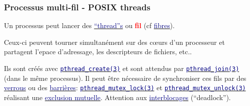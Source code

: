 \documentclass[lualatex,11pt,a4paper,svgnames,french]{beamer}
\newcommand{\clbhref}[2]{{\href{https:#1}{{\textcolor{Navy}{#2}}}}}
\newcommand{\clbman}[2]{{\href{https://man7.org/linux/man-pages/#1.html}{{\textcolor{Navy}{\texttt{#2}}}}}}
\newcommand{\clbrougras}[1]{{\textcolor{Red}{\textbf{#1}}}}
\begin{document}
\begin{frame}\frametitle{Processus multi-fil - POSIX threads}
  Un processus peut lancer des
  \clbhref{//fr.wikipedia.org/wiki/Thread\_(informatique)}{``thread''s}
  ou \clbrougras{fil} (cf
  \clbhref{//fr.wikipedia.org/wiki/Fibre\_(informatique)}{fibres}).

  \smallskip
  
Ceux-ci peuvent tourner simultanément sur des c{\oe}urs d'un
processeur et partagent l'epace d'adressage, les descripteurs de
fichiers, etc..

\smallskip
%
Ils sont créés avec
\clbman{man3/pthread_create.3}{pthread\_create(3)} et sont attendus par
\clbman{man3/pthread_join.3}{pthread\_join(3)} (dans le même processus).
%   
\smallskip
Il peut être nécessaire de synchroniser ces fils par des
\clbhref{https://fr.wikipedia.org/wiki/Verrou\_(informatique)}{verrous}
ou des
\clbhref{https://fr.wikipedia.org/wiki/Barrière\_de\_syncrhonisation}{barrières}:
\clbman{man3/pthread_mutex_lock.3}{pthread\_mutex\_lock(3)} et
\clbman{man3/pthread_mutex_unlock.3}{pthread\_mutex\_unlock(3)}
réalisant une
\clbhref{https://fr.wikipedia.org/wiki/Exclusion\_mutuelle}{exclusion
  mutuelle}. Attention aux
\clbhref{https://fr.wikipedia.org/wiki/Interblocage}{interblocages}
(``deadlock'').

\end{frame}
\end{document}
